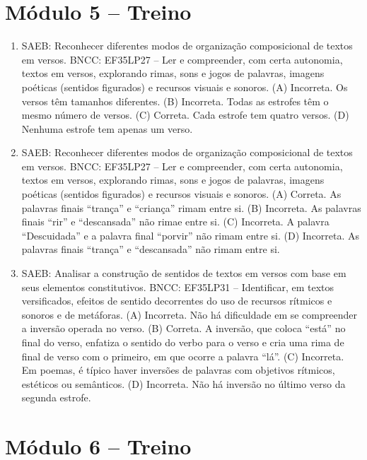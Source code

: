 \section*{Módulo 5 – Treino}

\begin{enumerate}
\item
SAEB: Reconhecer diferentes modos de organização composicional de textos em versos.
BNCC: EF35LP27 -- Ler e compreender, com certa autonomia, textos em
versos, explorando rimas, sons e jogos de palavras, imagens poéticas
(sentidos figurados) e recursos visuais e sonoros.
(A) Incorreta. Os versos têm tamanhos diferentes.
(B) Incorreta. Todas as estrofes têm o mesmo número de versos.
(C) Correta. Cada estrofe tem quatro versos.
(D) Nenhuma estrofe tem apenas um verso.

\item
SAEB: Reconhecer diferentes modos de organização composicional de textos em versos.
BNCC: EF35LP27 -- Ler e compreender, com certa autonomia, textos em
versos, explorando rimas, sons e jogos de palavras, imagens poéticas
(sentidos figurados) e recursos visuais e sonoros.
(A) Correta. As palavras finais ``trança'' e ``criança'' rimam entre si.
(B) Incorreta. As palavras finais ``rir'' e ``descansada'' não rimae entre si.
(C) Incorreta. A palavra ``Descuidada'' e a palavra final ``porvir'' não rimam entre si.
(D) Incorreta. As palavras finais ``trança'' e ``descansada'' não rimam entre si.

\item
SAEB: Analisar a construção de sentidos de textos em versos com base em seus elementos constitutivos.
BNCC: EF35LP31 -- Identificar, em textos versificados, efeitos de sentido
decorrentes do uso de recursos rítmicos e sonoros e de metáforas.
(A) Incorreta. Não há dificuldade em se compreender a inversão operada no verso.
(B) Correta. A inversão, que coloca ``está'' no final do verso, enfatiza o sentido do verbo para o verso e cria uma rima de final de verso com o primeiro, em que ocorre a palavra ``lá''.
(C) Incorreta. Em poemas, é típico haver inversões de palavras com objetivos rítmicos, estéticos ou semânticos.
(D) Incorreta. Não há inversão no último verso da segunda estrofe.
\end{enumerate}

\section*{Módulo 6 – Treino}


